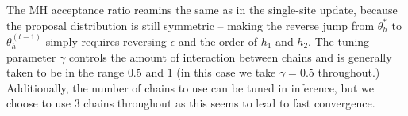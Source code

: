 The MH acceptance ratio reamins the same as in the single-site update, because the proposal distribution is still symmetric -- making the reverse jump from $\theta_h^*$ to $\theta_h^{(t-1)}$ simply requires reversing $\epsilon$ and the order of $h_1$ and $h_2$. The tuning parameter $\gamma$ controls the amount of interaction between chains and is generally taken to be in the range $0.5$ and $1$ (in this case we take $\gamma = 0.5$ throughout.) Additionally, the number of chains to use can be tuned in inference, but we choose to use $3$ chains throughout as this seems to lead to fast convergence.

